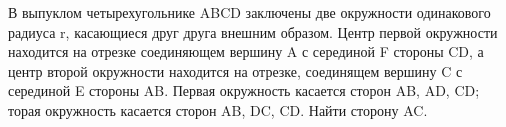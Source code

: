 \documentclass[preview]{standalone}
\begin{document}
\centering В выпуклом четырехугольнике ABCD заключены две окружности одинакового радиуса r, 
                          касающиеся друг друга внешним образом. Центр первой окружности находится на отрезке 
                          соединяющем вершину A с серединой F стороны CD, а центр второй окружности находится 
                          на отрезке, соединящем вершину C с серединой E стороны AB. Первая окружность касается 
                          сторон AB, AD, CD; торая окружность касается сторон AB, DC, CD. Найти сторону AC.
\end{document}
